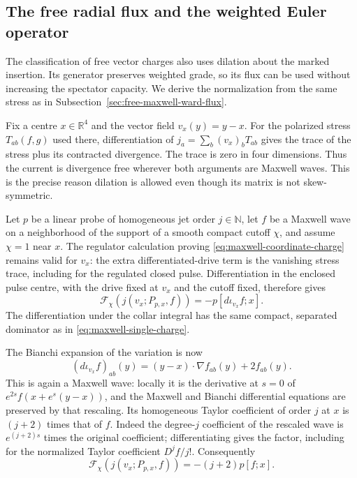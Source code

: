 \subsection{The free radial flux and the weighted Euler operator}
\label{sec:free-maxwell-radial-flux}

The classification of free vector charges also uses dilation about the
marked insertion. Its generator preserves weighted grade, so its flux
can be used without increasing the spectator capacity. We derive the
normalization from the same stress as in
Subsection~\ref{sec:free-maxwell-ward-flux}.

Fix a centre $x\in\mathbb R^4$ and the vector field $v_x(y)=y-x$.
For the polarized stress $T_{ab}(f,g)$ used there, differentiation of
$j_a=\sum_b(v_x)_bT_{ab}$ gives the trace of the stress plus its
contracted divergence. The trace is zero in four dimensions. Thus the
current is divergence free wherever both arguments are Maxwell waves.
This is the precise reason dilation is allowed even though its matrix
is not skew-symmetric.

Let $p$ be a linear probe of homogeneous jet order $j\in\mathbb N$,
let $f$ be a Maxwell wave on a neighborhood of the support of a smooth
compact cutoff $\chi$, and assume $\chi=1$ near $x$. The regulator
calculation proving \eqref{eq:maxwell-coordinate-charge} remains valid
for $v_x$: the extra differentiated-drive term is the vanishing stress
trace, including for the regulated closed pulse. Differentiation in
the enclosed pulse centre, with the drive fixed at $v_x$ and the
cutoff fixed, therefore gives
\[
 \mathcal F_\chi(j(v_x;P_{p,x},f))
                         =-p[d\iota_{v_x}f;x].
\]
The differentiation under the collar integral has the same compact,
separated dominator as in \eqref{eq:maxwell-single-charge}.

The Bianchi expansion of the variation is now
\[
 (d\iota_{v_x}f)_{ab}(y)
       =(y-x)\cdot\nabla f_{ab}(y)+2f_{ab}(y).
\]
This is again a Maxwell wave: locally it is the derivative at $s=0$
of $e^{2s}f(x+e^s(y-x))$, and the Maxwell and Bianchi differential
equations are preserved by that rescaling. Its homogeneous Taylor
coefficient of order $j$ at $x$ is $(j+2)$ times that of $f$.
Indeed the degree-$j$ coefficient of the rescaled wave is
$e^{(j+2)s}$ times the original coefficient; differentiating gives
the factor, including for the normalized Taylor coefficient $D^jf/j!$.
Consequently
\begin{equation}\label{eq:maxwell-radial-single-charge}
 \mathcal F_\chi(j(v_x;P_{p,x},f))=-(j+2)p[f;x].
\end{equation}

